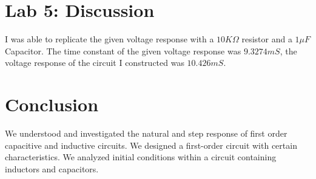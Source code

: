 \documentclass[12pt]{article}
\begin{document}
\section*{Lab 5: Discussion}
I was able to replicate the given voltage response with a $10K\Omega$ resistor and a $1\mu F$ Capacitor. The time constant of the given voltage response was $9.3274mS$, the voltage response of the circuit I constructed was  $10.426mS$.
\pagebreak
\section*{Conclusion}

We understood and investigated the natural and step response of first order capacitive and inductive circuits. We designed a first-order circuit with certain characteristics. We analyzed initial conditions within a circuit containing inductors and capacitors. 
\end{document}
